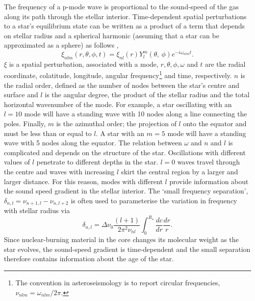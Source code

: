 The frequency of a p-mode wave is proportional to the sound-speed of the gas
along its path through the stellar interior.
Time-dependent spatial perturbations to a star's equilibrium state can be
written as a product of a term that depends on stellar radius and a spherical
harmonic (assuming that a star can be approximated as a sphere) as follows
\citep{Brown1994},
\begin{equation}
    \xi_{nlm}(r, \theta, \phi, t) = \xi_{nl}(r)Y_l^m(\theta, \
    \phi)e^{-i\omega_{nlm}t}.
\end{equation}
$\xi$ is a spatial perturbation, associated with a mode, $r, \theta, \phi,
\omega$ and $t$ are the radial coordinate, colatitude, longitude, angular
frequency\footnote{The convention in asteroseismology is to report circular
frequencies, $\nu_{nlm} = \omega_{nlm}/2\pi$.} and time, respectively.
$n$ is the radial order, defined as the number of nodes between the star's
centre and surface and $l$ is the angular degree, the product of the stellar
radius and the total horizontal wavenumber of the mode.
For example, a star oscillating with an $l = 10$ mode will have a standing
wave with 10 nodes along a line connecting the poles.
Finally, $m$ is the azimuthal order; the projection of $l$ onto the equator
and must be less than or equal to $l$.
A star with an $m = 5$ mode will have a standing wave with 5 nodes along the
equator.
The relation between $\omega$ and $n$ and $l$ is complicated and depends on the
structure of the star.
Oscillations with different values of $l$ penetrate to different depths in the
star.
$l = 0$ waves travel through the centre and waves with increasing $l$ skirt
the central region by a larger and larger distance.
For this reason, modes with different $l$ provide information about the sound
speed gradient in the stellar interior.
The `small frequency separation', $\delta_{n,l} = \nu_{n+1, l} - \nu_{n, l+2}$
is often used to parameterise the variation in frequency with stellar radius
via \citep{Brown1994}
\begin{equation}
    \delta_{n,l} = \Delta\nu_0\frac{(l + 1)}{2\pi^2\nu_{nl}}\int_0^{R_\star}
    \frac{dc}{dr}\frac{dr}{r}.
\end{equation}
Since nuclear-burning material in the core changes its molecular weight as the
star evolves, the sound-speed gradient is time-dependent and the small
separation therefore contains information about the age of the star.

